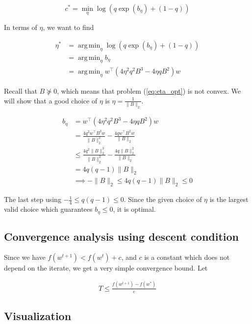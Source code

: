 \documentclass[11pt]{article}
\DeclareMathOperator*{\argmin}{arg\,min}
\begin{document}
\begin{equation}
    c^* = \min_{\eta} \log( q \exp(b_\eta ) + (1 - q))
\end{equation}

In terms of $\eta$, we want to find

\begin{equation}
\label{eq:eta_opt}
\begin{split}
    \eta^* &= \argmin_{\eta} \log( q \exp(b_\eta ) + (1 - q)) \\
    &= \argmin_{\eta} b_\eta \\
    &= \argmin_{\eta} w^{\top} ( 4 \eta^2 q^2 B^3 - 4 \eta q B^2)w
\end{split}
\end{equation}

Recall that $B \nsucceq 0$, which means that problem (\ref{eq:eta_opt}) is not convex. We will show that a good choice of $\eta$ is $\eta = \frac{1}{\|B\|_2}$.

\begin{align*}
    b_\eta &= w^{\top} ( 4 \eta^2 q^2 B^3 - 4 \eta q B^2)w \\
    &= \frac{4 q^2 w^{\top} B^3 w}{\|B\|_2^2} - \frac{4 q w^{\top} B^2 w}{\|B\|_2} \\
    &\leq \frac{4 q^2 \|B\|_2^3}{\|B\|_2^2} - \frac{4 q \|B\|_2^2 }{\|B\|_2} \\
    &= 4 q (q-1) \|B\|_2 \\
    &\implies -\|B\|_2 \leq 4 q (q-1) \|B\|_2 \leq 0
\end{align*}

The last step using $-\frac{1}{4} \leq q (q-1) \leq 0$. Since the given choice of $\eta$ is the largest valid choice which guarantees $b_\eta \leq 0$, it is optimal.

\subsection{Convergence analysis using descent condition}

Since we have $f(w^{t+1}) < f(w^t) + c$, and $c$ is a constant which does not depend on the iterate, we get a very simple convergence bound. Let

\begin{align*}
    T \leq \frac{f(w^{t+1}) - f(w^*)}{c}
\end{align*}

\subsection{Visualization}
\end{document}
